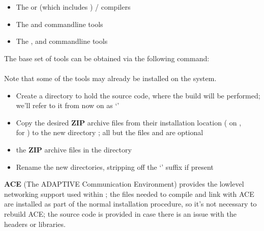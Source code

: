 \tertiaryEnd
{}
\begin{itemize}
\item The  or  (which includes ) /
 compilers
\item\exSp{}The  and  command\longDash{}line tools
\item\exSp{}The ,  and 
command\longDash{}line tools
\end{itemize}
The base set of tools can be obtained via the following command:\\
\\
Note that some of the tools may already be installed on the \linux{} system.
\tertiaryEnd
\secondaryEnd
{}
\begin{itemize}
\item Create a directory to hold the source code, where the build will be performed; we'll
refer to it from now on as `'
\item\exSp{}Copy the desired \textbf{ZIP} archive files from their installation location
( on \osx,\\
 for
\win{}) to the new directory ; all but the files
 and  are optional
\item\exSp{} the \textbf{ZIP} archive files in the directory
\item\exSp{}Rename the new directories, stripping off the `' suffix if
present
\end{itemize}
\secondaryEnd
{}
\textbf{ACE} (The ADAPTIVE Communication Environment) provides the low\longDash{}level
networking support used within \mplusm{}; the files needed to compile and link with ACE
are installed as part of the normal \mplusm{} installation procedure, so it's not
necessary to rebuild ACE; the source code is provided in case there is an issue with the
headers or libraries.\\

